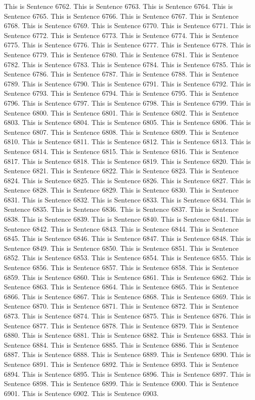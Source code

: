 \documentclass{article}
\begin{document}
This is Sentence 6762.
This is Sentence 6763.
This is Sentence 6764.
This is Sentence 6765.
This is Sentence 6766.
This is Sentence 6767.
This is Sentence 6768.
This is Sentence 6769.
This is Sentence 6770.
This is Sentence 6771.
This is Sentence 6772.
This is Sentence 6773.
This is Sentence 6774.
This is Sentence 6775.
This is Sentence 6776.
This is Sentence 6777.
This is Sentence 6778.
This is Sentence 6779.
This is Sentence 6780.
This is Sentence 6781.
This is Sentence 6782.
This is Sentence 6783.
This is Sentence 6784.
This is Sentence 6785.
This is Sentence 6786.
This is Sentence 6787.
This is Sentence 6788.
This is Sentence 6789.
This is Sentence 6790.
This is Sentence 6791.
This is Sentence 6792.
This is Sentence 6793.
This is Sentence 6794.
This is Sentence 6795.
This is Sentence 6796.
This is Sentence 6797.
This is Sentence 6798.
This is Sentence 6799.
This is Sentence 6800.
This is Sentence 6801.
This is Sentence 6802.
This is Sentence 6803.
This is Sentence 6804.
This is Sentence 6805.
This is Sentence 6806.
This is Sentence 6807.
This is Sentence 6808.
This is Sentence 6809.
This is Sentence 6810.
This is Sentence 6811.
This is Sentence 6812.
This is Sentence 6813.
This is Sentence 6814.
This is Sentence 6815.
This is Sentence 6816.
This is Sentence 6817.
This is Sentence 6818.
This is Sentence 6819.
This is Sentence 6820.
This is Sentence 6821.
This is Sentence 6822.
This is Sentence 6823.
This is Sentence 6824.
This is Sentence 6825.
This is Sentence 6826.
This is Sentence 6827.
This is Sentence 6828.
This is Sentence 6829.
This is Sentence 6830.
This is Sentence 6831.
This is Sentence 6832.
This is Sentence 6833.
This is Sentence 6834.
This is Sentence 6835.
This is Sentence 6836.
This is Sentence 6837.
This is Sentence 6838.
This is Sentence 6839.
This is Sentence 6840.
This is Sentence 6841.
This is Sentence 6842.
This is Sentence 6843.
This is Sentence 6844.
This is Sentence 6845.
This is Sentence 6846.
This is Sentence 6847.
This is Sentence 6848.
This is Sentence 6849.
This is Sentence 6850.
This is Sentence 6851.
This is Sentence 6852.
This is Sentence 6853.
This is Sentence 6854.
This is Sentence 6855.
This is Sentence 6856.
This is Sentence 6857.
This is Sentence 6858.
This is Sentence 6859.
This is Sentence 6860.
This is Sentence 6861.
This is Sentence 6862.
This is Sentence 6863.
This is Sentence 6864.
This is Sentence 6865.
This is Sentence 6866.
This is Sentence 6867.
This is Sentence 6868.
This is Sentence 6869.
This is Sentence 6870.
This is Sentence 6871.
This is Sentence 6872.
This is Sentence 6873.
This is Sentence 6874.
This is Sentence 6875.
This is Sentence 6876.
This is Sentence 6877.
This is Sentence 6878.
This is Sentence 6879.
This is Sentence 6880.
This is Sentence 6881.
This is Sentence 6882.
This is Sentence 6883.
This is Sentence 6884.
This is Sentence 6885.
This is Sentence 6886.
This is Sentence 6887.
This is Sentence 6888.
This is Sentence 6889.
This is Sentence 6890.
This is Sentence 6891.
This is Sentence 6892.
This is Sentence 6893.
This is Sentence 6894.
This is Sentence 6895.
This is Sentence 6896.
This is Sentence 6897.
This is Sentence 6898.
This is Sentence 6899.
This is Sentence 6900.
This is Sentence 6901.
This is Sentence 6902.
This is Sentence 6903.
\end{document}
